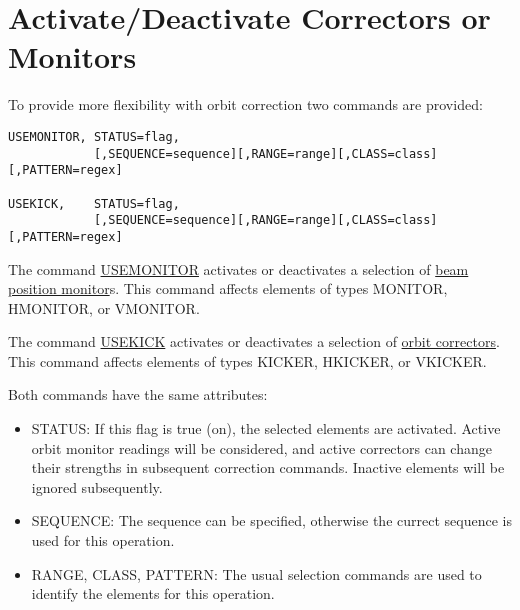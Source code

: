 
\section{Activate/Deactivate Correctors or Monitors}

To provide more flexibility with orbit correction two commands are provided: 

\begin{verbatim}
USEMONITOR, STATUS=flag,
            [,SEQUENCE=sequence][,RANGE=range][,CLASS=class][,PATTERN=regex]

USEKICK,    STATUS=flag,
            [,SEQUENCE=sequence][,RANGE=range][,CLASS=class][,PATTERN=regex]
\end{verbatim}

The command \href{monitor}{USEMONITOR} activates or deactivates a
selection of \href{../Introduction/monitors.html}{beam position
 monitor}s. This command affects elements of types MONITOR, HMONITOR,
or VMONITOR.    

The command  \href{kick}{USEKICK} activates or deactivates a selection
of \href{../Introduction/kickers.html}{orbit correctors}. This command
affects elements of types KICKER, HKICKER, or VKICKER.   



Both commands have the same attributes: 
\begin{itemize}
	\item STATUS: If this flag is true (on), the selected elements
          are activated. Active orbit monitor readings will be
          considered, and active correctors can change their strengths
          in subsequent correction commands. Inactive elements will be
          ignored subsequently.  
	\item SEQUENCE: The sequence can be specified, otherwise the
          currect sequence is used for this operation.  
	\item RANGE, CLASS, PATTERN: The usual selection commands are
          used to identify the elements for this operation.  
\end{itemize} 

